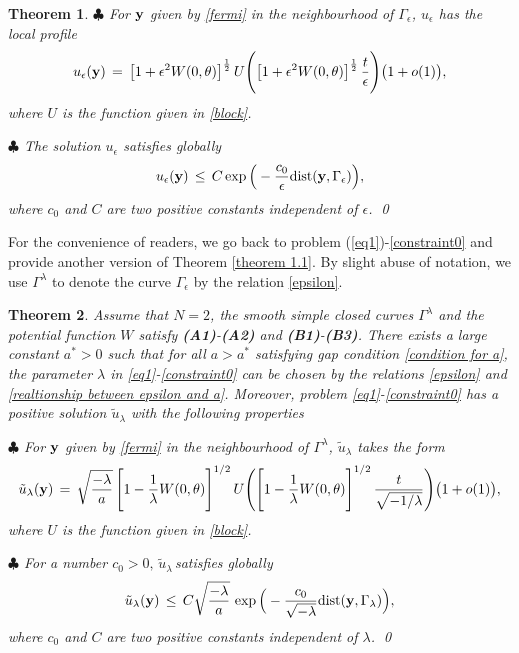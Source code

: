 \documentclass[10pt, reqno]{amsart}
\numberwithin{equation}{section}
\newtheorem{theorem}{Theorem}[section]
\theoremstyle{definition}
\def\G{{\mathfrak G}}
\def\G{\Gamma}
\begin{document}
{\begin{theorem}
\smallskip
\noindent $\clubsuit$
For ${\bf y}$ given by \eqref{fermi} in the neighbourhood of $\Gamma_\epsilon$,
$u_{\epsilon}$ has the local profile
\begin{equation}
\label{taketheform}
 u_{\epsilon}({\bf y})\,=\, \big[1+ \epsilon^2 W(0, \theta) \big]^{\frac 12}\, U\Bigg(\big[1+ \epsilon^2 W(0, \theta) \big]^{\frac 12}\, \frac{t} \epsilon\Bigg)\big(1+o(1)\big),
\end{equation}
where $U$ is the function given in \eqref{block}.


\smallskip
\noindent$\clubsuit$
The solution $u_{\epsilon}$ satisfies globally
$$u_{\epsilon}({\bf y})\,\leq\, C\exp \Big(-\frac{c_0}{\epsilon} {\mathrm{dist}} ({\bf y}, \Gamma_\epsilon)\Big),$$
where $c_0$ and $C$ are two positive constants independent of $\epsilon$.
\qed
\end{theorem}

For the convenience of readers, we go back to problem (\ref{eq1})-\eqref{constraint0} and provide another version of Theorem \ref{theorem 1.1}.
By slight abuse of notation, we use $\G^\lambda$ to denote the curve $\G_\epsilon$ by the relation \eqref{epsilon}.

\begin{theorem}
\label{theorem 1.11}
Assume that $N=2$, the smooth simple closed curves $\Gamma^\lambda$ and the potential function $W$ satisfy {\bf{(A1)}}-{\bf{(A2)}} and {\bf{(B1)}}-{\bf{(B3)}}.
There exists a large constant $a^*>0$ such that for all $a > a^*$ satisfying gap condition \eqref{condition for a},
the parameter $\lambda$ in \eqref{eq1}-\eqref{constraint0} can be chosen by the relations \eqref{epsilon} and \eqref{realtionship between epsilon and a}.
Moreover, problem \eqref{eq1}-\eqref{constraint0} has a positive solution $\tilde{u}_\lambda$ with the following properties

\smallskip
\noindent $\clubsuit$
For ${\bf y}$ given by \eqref{fermi} in the neighbourhood of $\Gamma^\lambda $,
$\tilde{u}_\lambda$ takes the form
\begin{equation}
\label{taketheform1}
\tilde{u}_{\lambda}({\bf y})
\,=\,
\sqrt{\frac{-\lambda} {a} }\, \Bigg[1 - \frac 1{\lambda} W(0, \theta) \Bigg]^{1/2}
\, U\Bigg(\Bigg[1 - \frac 1{\lambda} W(0, \theta) \Bigg]^{1/2}\, \frac{t}{\sqrt{-1/\lambda}} \Bigg)\big(1+o(1)\big),
\end{equation}
where $U$ is the function given in \eqref{block}.

\smallskip
\noindent $\clubsuit$
For a number $c_0>0, \,\tilde{u}_{\lambda}$\,satisfies globally
$$
\tilde{u}_{\lambda}({\bf y})\,\leq\, C\sqrt{\frac{-\lambda} a}\, \exp \Big(- \frac{c_0} {\sqrt{-\lambda}}{\mathrm{dist}} ({\bf y}, \Gamma_\lambda)\Big),
$$
where $c_0$ and $C$ are two positive constants independent of $\lambda$.
\qed
\end{theorem}






}
\end{document}

